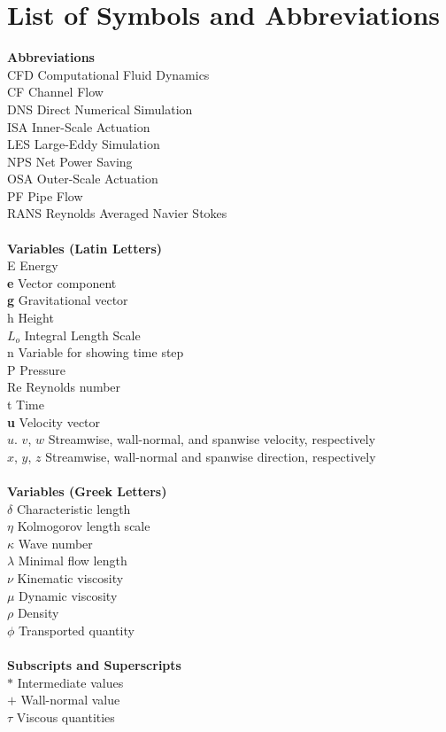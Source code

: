 
\section*{List of Symbols and Abbreviations}
\begin{tabbing}
	\textbf{Abbreviations} \= \\
	CFD \> Computational Fluid Dynamics\\
	CF \> Channel Flow \\
	DNS \> Direct Numerical Simulation \\
	ISA \> Inner-Scale Actuation \\
	LES \> Large-Eddy Simulation\\
	NPS \> Net Power Saving \\
	OSA \> Outer-Scale Actuation\\
	PF \> Pipe Flow \\
	RANS \> Reynolds Averaged Navier Stokes\\
	\\
	\textbf{Variables (Latin Letters)}\\
	E \> Energy\\
	\textbf{e} \> Vector component \\
	\textbf{g} \> Gravitational vector \\
	h \> Height \\
	$L_o$ \> Integral Length Scale\\
	n \> Variable for showing time step \\
	P \> Pressure \\
	Re \> Reynolds number\\
	t \> Time \\
	\textbf{u} \> Velocity vector \\
	$u$. $v$, $w$ \> Streamwise, wall-normal, and spanwise velocity, respectively\\
	$x$, $y$, $z$  \> Streamwise, wall-normal and spanwise direction, respectively\\
	\\
	
	\textbf{Variables (Greek Letters)}\\
	$\delta$ \> Characteristic length \\
	$\eta$ \> Kolmogorov length scale\\
	$\kappa$ \> Wave number \\
	$\lambda$ \> Minimal flow length \\
	$\nu$ \> Kinematic viscosity \\
	$\mu$ \> Dynamic viscosity\\
	$\rho$ \> Density\\
	$\phi$ \> Transported quantity
	\\
	\\
	\textbf{Subscripts and Superscripts}\\
	$*$ \> Intermediate values\\
	$+$ \> Wall-normal value\\
	$\tau$ \> Viscous quantities
	
\end{tabbing}







